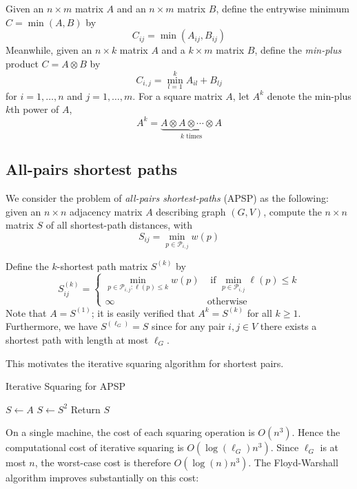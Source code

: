 \documentclass{article} %
\begin{document}
Given an $n \times m$ matrix $A$ and an $n \times m$ matrix $B$, define the entrywise minimum $C = \min(A, B)$ by
\[
C_{ij} = \min(A_{ij}, B_{ij})
\]
Meanwhile, given an $n \times k$ matrix $A$ and a $k \times m$ matrix $B$,
define the \emph{min-plus} product $C = A \otimes B$ by
\[
C_{i,j} = \min_{l = 1}^k A_{il} + B_{lj}
\]
for $i = 1,\hdots, n$ and $j = 1,\hdots, m$.
For a square matrix $A$, let $A^k$ denote the min-plus $k$th power of $A$,
\[
A^k = \underbrace{A \otimes A \otimes \cdots \otimes A}_{\text{$k$ times}}
\]

\subsection{All-pairs shortest paths}

We consider the problem of \emph{all-pairs shortest-paths} (APSP) as the
following: given an $n \times n$ adjacency matrix $A$ describing graph
$(G,V)$, compute the $n \times n$ matrix $S$ of all shortest-path distances, with
\[
S_{ij} = \min_{p \in \mathcal{P}_{i,j}} w(p)
\]

Define the $k$-shortest path matrix $S^{(k)}$ by
\[
S^{(k)}_{ij} = \begin{cases} \min_{p \in \mathcal{P}_{i, j}: \ell(p) \leq k} w(p) &\text{ if }\min_{p \in \mathcal{P}_{i,j}} \ell(p) \leq k\\
\infty & \text{otherwise}
\end{cases}
\]
Note that $A = S^{(1)}$; it is easily verified that $A^k = S^{(k)}$
for all $k \geq 1$.  Furthermore, we have $S^{(\ell_G)} = S$ since for
any pair $i, j \in V$ there exists a shortest path with length at most
$\ell_G$.

This motivates the iterative squaring algorithm for shortest pairs.

\begin{algorithm}[H]
\caption{Iterative Squaring for APSP}
\begin{algorithmic}
  \State $S \leftarrow A$
    \State $S \leftarrow S^2$
  \EndFor
  \State Return $S$
\EndFunction
\end{algorithmic}
\end{algorithm}

On a single machine, the cost of each squaring operation is $O(n^3)$.
Hence the computational cost of iterative squaring is $O(\log(\ell_G) n^3)$.
Since $\ell_G$ is at most $n$, the worst-case cost is therefore $O(\log(n) n^3)$.
The Floyd-Warshall algorithm improves substantially on this cost:
\end{document}
